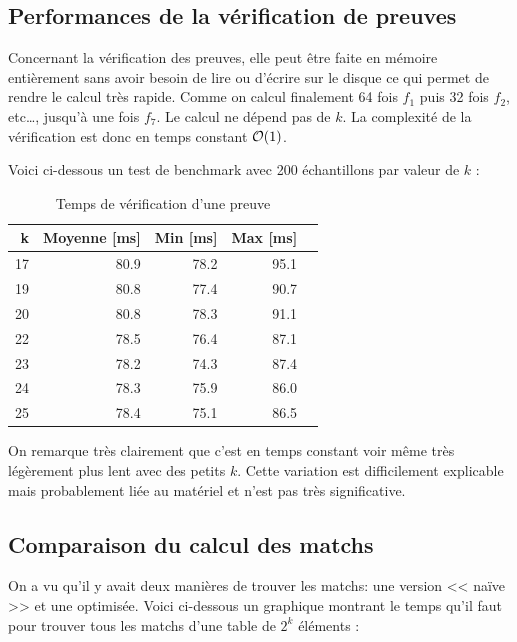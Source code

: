 \subsection{Performances de la vérification de preuves}

Concernant la vérification des preuves, elle peut être faite en mémoire entièrement sans avoir besoin de lire ou d'écrire sur le disque ce qui permet de rendre le calcul très rapide. Comme on calcul finalement 64 fois $f_1$ puis 32 fois $f_2$, etc\dots, jusqu'à une fois $f_7$. Le calcul ne dépend pas de $k$. La complexité de la vérification est donc en temps constant $\mathcal{O}(1)$.

Voici ci-dessous un test de benchmark avec 200 échantillons par valeur de $k$ :

\begin{table}[H]
  \centering
  \begin{tabular}{rrrrr}
    \textbf{k} & \textbf{Moyenne [ms]} & \textbf{Min [ms]} & \textbf{Max [ms]} \\
    \hline
    \hline
    17 & 80.9 & 78.2 & 95.1 \\
    \hline
    19 & 80.8 & 77.4 & 90.7 \\
    \hline
    20 & 80.8 & 78.3 & 91.1 \\
    \hline
    22 & 78.5 & 76.4 & 87.1 \\
    \hline
    23 & 78.2 & 74.3 & 87.4 \\
    \hline
    24 & 78.3 & 75.9 & 86.0 \\
    \hline
    25 & 78.4 & 75.1 & 86.5
  \end{tabular}
  \caption{Temps de vérification d'une preuve}
\end{table}

On remarque très clairement que c'est en temps constant voir même très légèrement plus lent avec des petits $k$. Cette variation est difficilement explicable mais probablement liée au matériel et n'est pas très significative. 

\subsection{Comparaison du calcul des matchs}

On a vu qu'il y avait deux manières de trouver les matchs: une version << naïve >> et une optimisée. Voici ci-dessous un graphique montrant le temps qu'il faut pour trouver tous les matchs d'une table de $2^k$ éléments :

